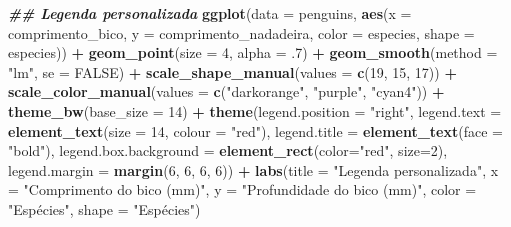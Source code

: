 \documentclass[
]{article}
\newenvironment{Shaded}{\begin{snugshade}}{\end{snugshade}}
\newcommand{\AttributeTok}[1]{\textcolor[rgb]{0.13,0.29,0.53}{#1}}
\newcommand{\ConstantTok}[1]{\textcolor[rgb]{0.56,0.35,0.01}{#1}}
\newcommand{\DecValTok}[1]{\textcolor[rgb]{0.00,0.00,0.81}{#1}}
\newcommand{\DocumentationTok}[1]{\textcolor[rgb]{0.56,0.35,0.01}{\textbf{\textit{#1}}}}
\newcommand{\FunctionTok}[1]{\textcolor[rgb]{0.13,0.29,0.53}{\textbf{#1}}}
\newcommand{\NormalTok}[1]{#1}
\newcommand{\SpecialCharTok}[1]{\textcolor[rgb]{0.81,0.36,0.00}{\textbf{#1}}}
\newcommand{\StringTok}[1]{\textcolor[rgb]{0.31,0.60,0.02}{#1}}
\begin{document}
\begin{Shaded}
\begin{Highlighting}[]
\DocumentationTok{\#\# Legenda personalizada}
\FunctionTok{ggplot}\NormalTok{(}\AttributeTok{data =}\NormalTok{ penguins, }
       \FunctionTok{aes}\NormalTok{(}\AttributeTok{x =}\NormalTok{ comprimento\_bico, }\AttributeTok{y =}\NormalTok{ comprimento\_nadadeira,}
           \AttributeTok{color =}\NormalTok{ especies, }\AttributeTok{shape =}\NormalTok{ especies)) }\SpecialCharTok{+}
    \FunctionTok{geom\_point}\NormalTok{(}\AttributeTok{size =} \DecValTok{4}\NormalTok{, }\AttributeTok{alpha =}\NormalTok{ .}\DecValTok{7}\NormalTok{) }\SpecialCharTok{+}
    \FunctionTok{geom\_smooth}\NormalTok{(}\AttributeTok{method =} \StringTok{"lm"}\NormalTok{, }\AttributeTok{se =} \ConstantTok{FALSE}\NormalTok{) }\SpecialCharTok{+}
    \FunctionTok{scale\_shape\_manual}\NormalTok{(}\AttributeTok{values =} \FunctionTok{c}\NormalTok{(}\DecValTok{19}\NormalTok{, }\DecValTok{15}\NormalTok{, }\DecValTok{17}\NormalTok{)) }\SpecialCharTok{+}
    \FunctionTok{scale\_color\_manual}\NormalTok{(}\AttributeTok{values =} \FunctionTok{c}\NormalTok{(}\StringTok{"darkorange"}\NormalTok{, }\StringTok{"purple"}\NormalTok{, }\StringTok{"cyan4"}\NormalTok{)) }\SpecialCharTok{+}
    \FunctionTok{theme\_bw}\NormalTok{(}\AttributeTok{base\_size =} \DecValTok{14}\NormalTok{) }\SpecialCharTok{+}
    \FunctionTok{theme}\NormalTok{(}\AttributeTok{legend.position =} \StringTok{"right"}\NormalTok{,}
          \AttributeTok{legend.text =} \FunctionTok{element\_text}\NormalTok{(}\AttributeTok{size =} \DecValTok{14}\NormalTok{, }\AttributeTok{colour =} \StringTok{"red"}\NormalTok{),}
          \AttributeTok{legend.title =} \FunctionTok{element\_text}\NormalTok{(}\AttributeTok{face =} \StringTok{"bold"}\NormalTok{),}
          \AttributeTok{legend.box.background =} \FunctionTok{element\_rect}\NormalTok{(}\AttributeTok{color=}\StringTok{"red"}\NormalTok{, }\AttributeTok{size=}\DecValTok{2}\NormalTok{),}
          \AttributeTok{legend.margin =} \FunctionTok{margin}\NormalTok{(}\DecValTok{6}\NormalTok{, }\DecValTok{6}\NormalTok{, }\DecValTok{6}\NormalTok{, }\DecValTok{6}\NormalTok{)) }\SpecialCharTok{+}
    \FunctionTok{labs}\NormalTok{(}\AttributeTok{title =} \StringTok{"Legenda personalizada"}\NormalTok{, }\AttributeTok{x =} \StringTok{"Comprimento do bico (mm)"}\NormalTok{, }
         \AttributeTok{y =} \StringTok{"Profundidade do bico (mm)"}\NormalTok{, }\AttributeTok{color =} \StringTok{"Espécies"}\NormalTok{, }\AttributeTok{shape =} \StringTok{"Espécies"}\NormalTok{)}
\end{Highlighting}
\end{Shaded}
\end{document}
